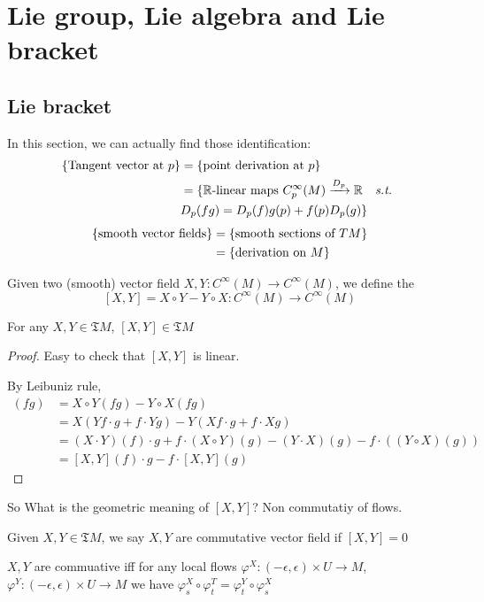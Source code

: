 \section{Lie group, Lie algebra and Lie bracket}
\subsection{Lie bracket}
In this section, we can actually find those identification:
\begin{align*}
    \{\text{Tangent vector at $ p $}\}&=\{\text{point derivation at $ p $}\}\\
    &=\{\text{$ \mathbb{R} $-linear maps  $ C^\infty_p(M)\xrightarrow{D_p} \mathbb{R} $ \st}\\&D_p(fg)=D_p(f)g(p)+f(p)D_p(g)\}
\end{align*}
\begin{align*}
    \{\text{smooth vector fields}\}&=\{\text{smooth sections of  $ TM $}\}\\
    &=\{\text{derivation on  $ M $}\}
\end{align*}
\begin{definition}
    Given two (smooth) vector field  $ X,Y:C^\infty(M)\rightarrow C^\infty(M) $, we define the 
    \[[X,Y]=X\circ Y-Y\circ X:C^\infty(M)\rightarrow C^\infty(M)\] 
\end{definition}
\begin{theorem}
    For any  $ X,Y\in\mathfrak{T}M $,  $ [X,Y]\in \mathfrak{T}M $  
\end{theorem}
\begin{proof}
    Easy to check that  $ [X,Y] $ is linear.
    
    By Leibuniz rule,
    \begin{align*}
        [X,Y](fg)&=X\circ Y(fg)-Y\circ X(fg)\\
        &=X(Yf\cdot g+f\cdot Yg)-Y(Xf\cdot g+f\cdot Xg)\\
        &=(X\cdot Y)(f)\cdot g+f\cdot(X\circ Y)(g)-(Y\cdot X)(g)-f\cdot ((Y\circ X)(g))\\
        &=[X,Y](f)\cdot g- f\cdot [X,Y](g)
    \end{align*}
\end{proof}
So What is the geometric meaning of  $ [X,Y] $? Non commutatiy of flows.
\begin{fact}
    Given  $ X,Y\in \mathfrak{T}M $, we say  $ X,Y $ are commutative vector field if  $ [X,Y]=0 $
    
    $ X,Y $ are commuative iff  for any local flows  $ \varphi^X:(-\epsilon,\epsilon)\times U\rightarrow M $, $ \varphi^Y:(-\epsilon,\epsilon)\times U\rightarrow M $  we have $ \varphi_s^X\circ \varphi_t^T=\varphi_t^Y\circ\varphi_s^X $   
\end{fact} 


